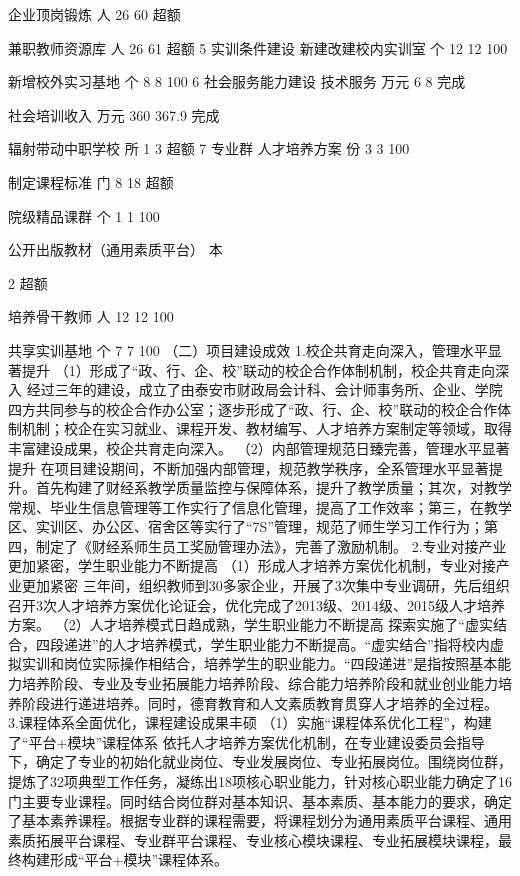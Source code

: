 企业顶岗锻炼
人
26
60
超额


兼职教师资源库
人
26
61
超额
5
实训条件建设
新建改建校内实训室
个
12
12
100%


新增校外实习基地
个
8
8
100%
6
社会服务能力建设
技术服务
万元
6
8
完成


社会培训收入
万元
360
367.9
完成


辐射带动中职学校
所
1
3
超额
7
专业群
人才培养方案
份
3
3
100%


制定课程标准
门
8
18
超额


院级精品课群
个
1
1
100%


公开出版教材（通用素质平台）
本

2
超额


培养骨干教师
人
12
12
100%


共享实训基地
个
7
7
100%
（二）项目建设成效
1.校企共育走向深入，管理水平显著提升
（1）形成了“政、行、企、校”联动的校企合作体制机制，校企共育走向深入
经过三年的建设，成立了由泰安市财政局会计科、会计师事务所、企业、学院四方共同参与的校企合作办公室；逐步形成了“政、行、企、校”联动的校企合作体制机制；校企在实习就业、课程开发、教材编写、人才培养方案制定等领域，取得丰富建设成果，校企共育走向深入。
（2）内部管理规范日臻完善，管理水平显著提升
在项目建设期间，不断加强内部管理，规范教学秩序，全系管理水平显著提升。首先构建了财经系教学质量监控与保障体系，提升了教学质量；其次，对教学常规、毕业生信息管理等工作实行了信息化管理，提高了工作效率；第三，在教学区、实训区、办公区、宿舍区等实行了“7S”管理，规范了师生学习工作行为；第四，制定了《财经系师生员工奖励管理办法》，完善了激励机制。
2.专业对接产业更加紧密，学生职业能力不断提高
（1）形成人才培养方案优化机制，专业对接产业更加紧密
三年间，组织教师到30多家企业，开展了3次集中专业调研，先后组织召开3次人才培养方案优化论证会，优化完成了2013级、2014级、2015级人才培养方案。
（2）人才培养模式日趋成熟，学生职业能力不断提高
探索实施了“虚实结合，四段递进”的人才培养模式，学生职业能力不断提高。“虚实结合”指将校内虚拟实训和岗位实际操作相结合，培养学生的职业能力。“四段递进”是指按照基本能力培养阶段、专业及专业拓展能力培养阶段、综合能力培养阶段和就业创业能力培养阶段进行递进培养。同时，德育教育和人文素质教育贯穿人才培养的全过程。
3.课程体系全面优化，课程建设成果丰硕 
（1）实施“课程体系优化工程”，构建了“平台+模块”课程体系
依托人才培养方案优化机制，在专业建设委员会指导下，确定了专业的初始化就业岗位、专业发展岗位、专业拓展岗位。围绕岗位群，提炼了32项典型工作任务，凝练出18项核心职业能力，针对核心职业能力确定了16门主要专业课程。同时结合岗位群对基本知识、基本素质、基本能力的要求，确定了基本素养课程。根据专业群的课程需要，将课程划分为通用素质平台课程、通用素质拓展平台课程、专业群平台课程、专业核心模块课程、专业拓展模块课程，最终构建形成“平台+模块”课程体系。
